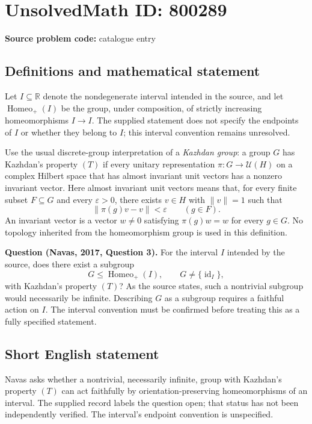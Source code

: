 \documentclass[11pt]{article}
\newcommand{\R}{\mathbb{R}}
\begin{document}
\section*{UnsolvedMath ID: 800289}
\textbf{Source problem code:} catalogue entry
\subsection{Definitions and mathematical statement}
Let \(I\subseteq\R\) denote the nondegenerate interval intended in the source, and let \(\operatorname{Homeo}_{+}(I)\) be the group, under composition, of strictly increasing homeomorphisms \(I\to I\). The supplied statement does not specify the endpoints of \(I\) or whether they belong to \(I\); this interval convention remains unresolved.

Use the usual discrete-group interpretation of a \emph{Kazhdan group}: a group \(G\) has Kazhdan's property \((T)\) if every unitary representation \(\pi:G\to\mathcal U(H)\) on a complex Hilbert space that has almost invariant unit vectors has a nonzero invariant vector. Here almost invariant unit vectors means that, for every finite subset \(F\subseteq G\) and every \(\varepsilon>0\), there exists \(v\in H\) with \(\|v\|=1\) such that
\[
\|\pi(g)v-v\|<\varepsilon\qquad(g\in F).
\]
An invariant vector is a vector \(w\ne0\) satisfying \(\pi(g)w=w\) for every \(g\in G\). No topology inherited from the homeomorphism group is used in this definition.

\textbf{Question (Navas, 2017, Question 3).} For the interval \(I\) intended by the source, does there exist a subgroup
\[
G\leq\operatorname{Homeo}_{+}(I),\qquad G\ne\{\operatorname{id}_I\},
\]
with Kazhdan's property \((T)\)? As the source states, such a nontrivial subgroup would necessarily be infinite. Describing \(G\) as a subgroup requires a faithful action on \(I\). The interval convention must be confirmed before treating this as a fully specified statement.
\subsection{Short English statement}
Navas asks whether a nontrivial, necessarily infinite, group with Kazhdan's property \((T)\) can act faithfully by orientation-preserving homeomorphisms of an interval. The supplied record labels the question open; that status has not been independently verified. The interval's endpoint convention is unspecified.
\end{document}

